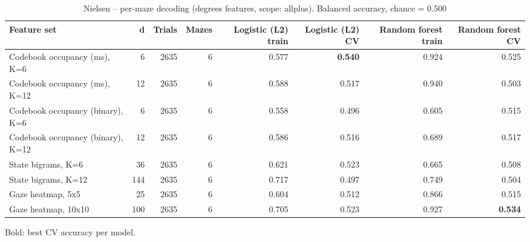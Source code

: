 \begin{table}[t]
\centering
\caption{Nielsen -- per-maze decoding (degrees features, scope: allplus). Balanced accuracy, chance = 0.500}
\label{tab:permaze_Nielsen}
\begin{tabular}{lrrrrrrr}
\toprule
Feature set & d & Trials & Mazes & Logistic (L2) train & Logistic (L2) CV & Random forest train & Random forest CV \\
\midrule
Codebook occupancy (ms), K=6 & 6 & 2635 & 6 & 0.577 & \textbf{0.540} & 0.924 & 0.525 \\
Codebook occupancy (ms), K=12 & 12 & 2635 & 6 & 0.588 & 0.517 & 0.940 & 0.503 \\
Codebook occupancy (binary), K=6 & 6 & 2635 & 6 & 0.558 & 0.496 & 0.605 & 0.515 \\
Codebook occupancy (binary), K=12 & 12 & 2635 & 6 & 0.586 & 0.516 & 0.689 & 0.517 \\
State bigrams, K=6 & 36 & 2635 & 6 & 0.621 & 0.523 & 0.665 & 0.508 \\
State bigrams, K=12 & 144 & 2635 & 6 & 0.717 & 0.497 & 0.749 & 0.504 \\
Gaze heatmap, 5x5 & 25 & 2635 & 6 & 0.604 & 0.512 & 0.866 & 0.515 \\
Gaze heatmap, 10x10 & 100 & 2635 & 6 & 0.705 & 0.523 & 0.927 & \textbf{0.534} \\
\bottomrule
\end{tabular}
\par\smallskip
{\footnotesize Bold: best CV accuracy per model.}
\end{table}
